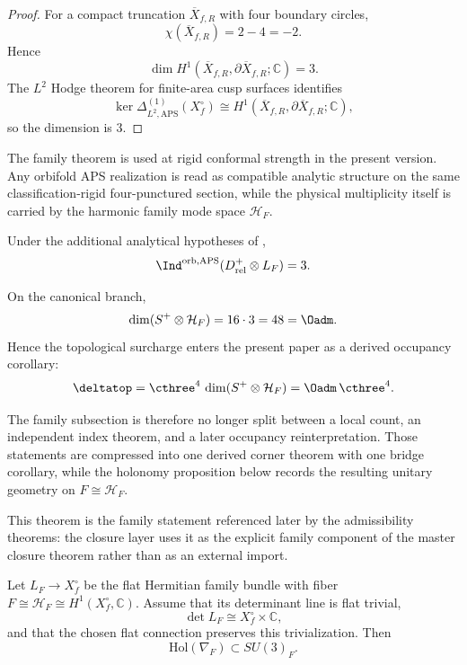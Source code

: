 \begin{proof}
For a compact truncation $\overline X_{f,R}$ with four boundary circles,
\[
\chi(\overline X_{f,R})=2-4=-2.
\]
Hence
\[
\dim H^1(\overline X_{f,R},\partial\overline X_{f,R};\mathbb C)=3.
\]
The $L^2$ Hodge theorem for finite-area cusp surfaces identifies
\[
\ker \Delta^{(1)}_{L^2,\mathrm{APS}}(X_f^\circ)
\cong
H^1(\overline X_{f,R},\partial\overline X_{f,R};\mathbb C),
\]
so the dimension is $3$.
\end{proof}

\begin{remark}
The family theorem is used at rigid conformal strength in the present version. Any orbifold APS
realization is read as compatible analytic structure on the same classification-rigid
four-punctured section, while the physical multiplicity itself is carried by the harmonic family
mode space $\mathcal H_F$.
\end{remark}

\begin{proposition}
\label{prop:orbifold-aps-compatibility}
Under the additional analytical hypotheses of ,
\[
\Ind^{\mathrm{orb,APS}}(D_{\mathrm{rel}}^+\otimes L_F)=3.
\]
\end{proposition}

\begin{corollary}
\label{cor:boundary-bulk-occupancy}
\label{cor:derived-occupancy-identity}
On the canonical branch,
\[
\dim(S^+\otimes \mathcal H_F)=16\cdot 3=48=\Oadm.
\]
Hence the topological surcharge enters the present paper as a derived occupancy corollary:
\[
\deltatop
=
\cthree^4\,\dim(S^+\otimes \mathcal H_F)
=
\Oadm\,\cthree^4.
\]
\end{corollary}

The family subsection is therefore no longer split between a local count, an independent index
theorem, and a later occupancy reinterpretation. Those statements are compressed into one derived
corner theorem with one bridge corollary, while the holonomy proposition below records the
resulting unitary geometry on $F\cong \mathcal H_F$.

This theorem is the family statement referenced later by the admissibility theorems: the closure layer uses it as the explicit family component of the master closure theorem rather than as an external import.

\begin{proposition}
\label{prop:family-holonomy-su3}
Let $L_F\to X_f^\circ$ be the flat Hermitian family bundle with fiber
$F\cong \mathcal H_F\cong H^1(X_f^\circ,\mathbb C)$. Assume that its determinant line is flat trivial,
\[
\det L_F \cong X_f^\circ\times \mathbb C,
\]
and that the chosen flat connection preserves this trivialization. Then
\[
\mathrm{Hol}(\nabla_F)\subset SU(3)_F.
\]
\end{proposition}

